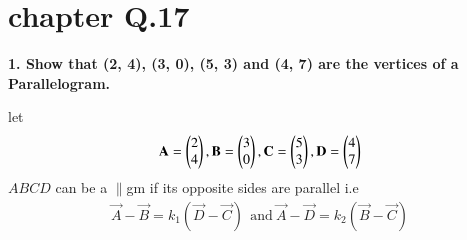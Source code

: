 \documentclass[journal,12pt,twocolumn]{IEEEtran}
\begin{document}
\renewcommand{\thefigure}{\theenumi}
\renewcommand{\thetable}{\theenumi}




\section{ chapter   Q.17 }


\textbf{1. Show that (2, 4), (3, 0), (5, 3) and (4, 7) are the vertices of a Parallelogram.}

\solution

let
\begin{align}
    \mathbf{A} = \begin{pmatrix}2\\4\end{pmatrix}, \mathbf{B} = \begin{pmatrix}3\\0\end{pmatrix}, \mathbf{C} = \begin{pmatrix}5\\3\end{pmatrix}, \mathbf{D} = \begin{pmatrix}4\\7\end{pmatrix}
\end{align}
$ABCD$ can be a $\parallel$gm if its opposite sides are parallel i.e
\begin{align}
    \vec{A} - \vec{B} = k_1 ( \vec{D} - \vec{C} )\ ~\text{and}~
    \vec{A} - \vec{D} = k_2 ( \vec{B} - \vec{C} ) 
\end{align}
\end{document}
